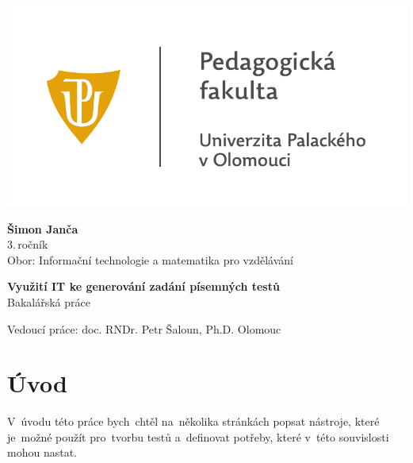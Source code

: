 \documentclass[10pt,a4paper]{article}
\begin{document}
	\begin{titlepage}
		\begin{center}
            {
            \centering
            \includegraphics[]{./img/UP_logo_PdF-UP_horizont_cz.pdf}
            }
			
			\vspace{3cm}

            {
                \LARGE
                \textbf{Šimon Janča}\\
                3.\,ročník\\[8mm]
                Obor: Informační technologie a matematika pro vzdělávání
            }

            \vspace{4cm}
			
			{
			    \textbf{\Huge Využití IT ke generování zadání písemných testů}\\[4mm]
			    \Large
			    Bakalářská práce
			}

            \vfill
            
            {
                Vedoucí práce:
                doc. RNDr. Petr Šaloun, Ph.D.
                \hfill
    			Olomouc \the\year{}
            }
			
		\end{center}
	\end{titlepage}
	\tableofcontents

	\newpage
    \clearpage
    \setcounter{page}{1}
	
	\section{Úvod}
        V~úvodu této práce bych~chtěl na~několika stránkách popsat nástroje, které je~možné použít pro~tvorbu testů a~definovat potřeby, které v~této souvislosti mohou nastat.
\end{document}
